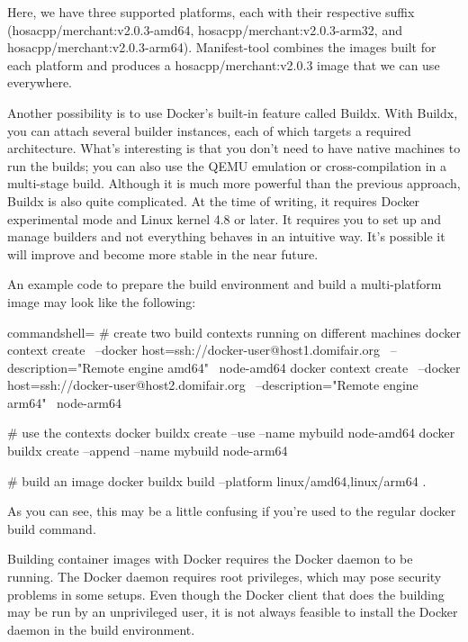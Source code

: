 Here, we have three supported platforms, each with their respective suffix (hosacpp/merchant:v2.0.3-amd64, hosacpp/merchant:v2.0.3-arm32, and hosacpp/merchant:v2.0.3-arm64). Manifest-tool combines the images built for each platform and produces a hosacpp/merchant:v2.0.3 image that we can use everywhere.

Another possibility is to use Docker's built-in feature called Buildx. With Buildx, you can attach several builder instances, each of which targets a required architecture. What's interesting is that you don't need to have native machines to run the builds; you can also use the QEMU emulation or cross-compilation in a multi-stage build. Although it is much more powerful than the previous approach, Buildx is also quite complicated. At the time of writing, it requires Docker experimental mode and Linux kernel 4.8 or later. It requires you to set up and manage builders and not everything behaves in an intuitive way. It's possible it will improve and become more stable in the near future.

An example code to prepare the build environment and build a multi-platform image may look like the following:

\begin{tcblisting}{commandshell={}}
# create two build contexts running on different machines
docker context create \
    --docker host=ssh://docker-user@host1.domifair.org \
    --description="Remote engine amd64" \
    node-amd64
docker context create \
    --docker host=ssh://docker-user@host2.domifair.org \
    --description="Remote engine arm64" \
    node-arm64

# use the contexts
docker buildx create --use --name mybuild node-amd64
docker buildx create --append --name mybuild node-arm64

# build an image
docker buildx build --platform linux/amd64,linux/arm64 .
\end{tcblisting}

As you can see, this may be a little confusing if you're used to the regular docker build command.


Building container images with Docker requires the Docker daemon to be running. The Docker daemon requires root privileges, which may pose security problems in some setups. Even though the Docker client that does the building may be run by an unprivileged user, it is not always feasible to install the Docker daemon in the build environment.

